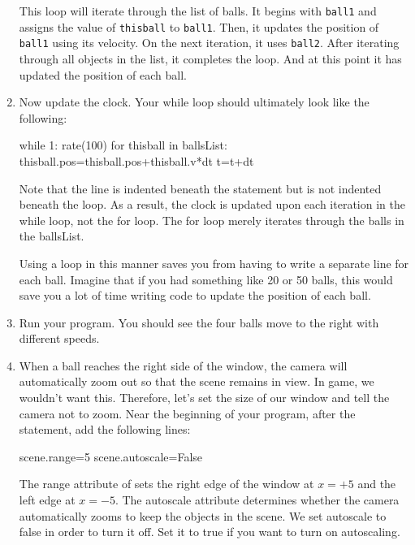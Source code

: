 \begin{enumerate}
This loop will iterate through the list of balls. It begins with \texttt{ball1} and assigns the value of \texttt{thisball} to \texttt{ball1}. Then, it updates the position of \texttt{ball1} using its velocity. On the next iteration, it uses \texttt{ball2}. After iterating through all objects in the list, it completes the loop. And at this point it has updated the position of each ball.

\item Now update the clock. Your while loop  should ultimately look like the following:

\begin{myvpython}
while 1:
    rate(100)
    for thisball in ballsList:
        thisball.pos=thisball.pos+thisball.v*dt    
    t=t+dt
\end{myvpython}

Note that the line  is indented beneath the  statement but is not indented  beneath the  loop. As a result, the clock is updated upon each iteration in the while loop, not the for loop. The for loop merely iterates through the balls in the ballsList.

Using a  loop in this manner saves you from having to write a separate line for each ball. Imagine that if you had something like 20 or 50 balls, this would save you a lot of time writing code to update the position of each ball.

\item Run your program. You should see the four balls move to the right with different speeds.

\item When a ball reaches the right side of the window, the camera will automatically zoom out so that the scene remains in view. In game, we wouldn't want this. Therefore, let's set the size of our window and tell the camera not to zoom. Near the beginning of your program, after the  statement, add the following lines:

\begin{myvpython}
scene.range=5
scene.autoscale=False
\end{myvpython}

The range attribute of  sets the right edge of the window at $x=+5$ and the left edge at $x=-5$. The autoscale attribute determines whether the camera automatically zooms to keep the objects in the scene. We set autoscale to false in order to turn it off. Set it to true if you want to turn on autoscaling.


\end{enumerate}

